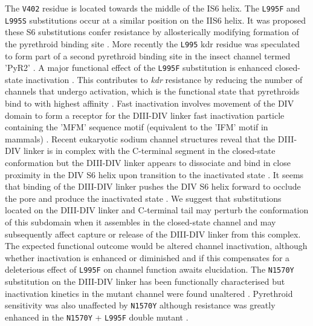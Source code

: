 \documentclass[a4paper,11pt,abstracton,hidelinks]{scrartcl}
\begin{document}
%
The \texttt{V402} residue is located towards the middle of the IS6 helix.
%
The \texttt{L995F} and \texttt{L995S} substitutions occur at a similar position on the IIS6 helix.
%
It was proposed these S6 substitutions confer resistance by allosterically modifying formation of the pyrethroid binding site \cite{OReilly2006}.
%
More recently the \texttt{L995} kdr residue was speculated to form part of a second pyrethroid binding site in the insect channel termed 'PyR2' \cite{Du2013, Du2015}.
%
A major functional effect of the \texttt{L995F} substitution is enhanced closed-state inactivation  \cite{Vais2000}.
%
This contributes to \textit{kdr} resistance by reducing the number of channels that undergo activation, which is the functional state that pyrethroids bind to with highest affinity \cite{Vais2000}.
%
Fast inactivation involves movement of the DIV domain to form a receptor for the DIII-DIV linker fast inactivation particle containing the 'MFM' sequence motif (equivalent to the 'IFM' motif in mammals) \cite{Capes2013, Dong2014}.
%
Recent eukaryotic sodium channel structures reveal that the DIII-DIV linker is in complex with the C-terminal segment in the closed-state conformation but the DIII-DIV linker appears to dissociate and bind in close proximity in the DIV S6 helix upon transition to the inactivated state \cite{Shen2017, Yan2017}.
%
It seems that binding of the DIII-DIV linker pushes the DIV S6 helix forward to occlude the pore and produce the inactivated state \cite{Yan2017}.
%
We suggest that substitutions located on the DIII-DIV linker and C-terminal tail may perturb the conformation of this subdomain when it assembles in the closed-state channel and may subsequently affect capture or release of the DIII-DIV linker from this complex.
%
The expected functional outcome would be altered channel inactivation, although whether inactivation is enhanced or diminished and if this compensates for a deleterious effect of \texttt{L995F} on channel function awaits elucidation.
%
The \texttt{N1570Y} substitution on the DIII-DIV linker has been functionally characterised but inactivation kinetics in the mutant channel were found unaltered \cite{Wang2015}.
%
Pyrethroid sensitivity was also unaffected by \texttt{N1570Y} although resistance was greatly enhanced in the \texttt{N1570Y} + \texttt{L995F} double mutant \cite{Wang2015}.
%
\end{document}
